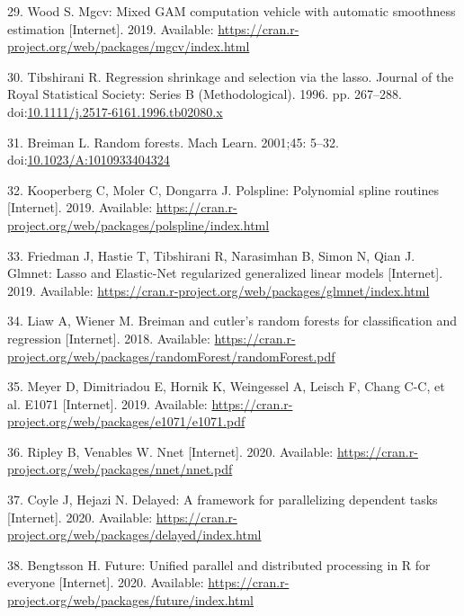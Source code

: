 \documentclass[10pt,letterpaper]{article}
\begin{document}
\leavevmode\hypertarget{ref-Wood2019-rc}{}%
29. Wood S. Mgcv: Mixed GAM computation vehicle with automatic
smoothness estimation {[}Internet{]}. 2019. Available:
\url{https://cran.r-project.org/web/packages/mgcv/index.html}

\leavevmode\hypertarget{ref-Tibshirani1996-vt}{}%
30. Tibshirani R. Regression shrinkage and selection via the lasso.
Journal of the Royal Statistical Society: Series B (Methodological).
1996. pp. 267--288.
doi:\href{https://doi.org/10.1111/j.2517-6161.1996.tb02080.x}{10.1111/j.2517-6161.1996.tb02080.x}

\leavevmode\hypertarget{ref-Breiman2001-vm}{}%
31. Breiman L. Random forests. Mach Learn. 2001;45: 5--32.
doi:\href{https://doi.org/10.1023/A:1010933404324}{10.1023/A:1010933404324}

\leavevmode\hypertarget{ref-Kooperberg2019-ma}{}%
32. Kooperberg C, Moler C, Dongarra J. Polspline: Polynomial spline
routines {[}Internet{]}. 2019. Available:
\url{https://cran.r-project.org/web/packages/polspline/index.html}

\leavevmode\hypertarget{ref-Friedman2019-uw}{}%
33. Friedman J, Hastie T, Tibshirani R, Narasimhan B, Simon N, Qian J.
Glmnet: Lasso and Elastic-Net regularized generalized linear models
{[}Internet{]}. 2019. Available:
\url{https://cran.r-project.org/web/packages/glmnet/index.html}

\leavevmode\hypertarget{ref-Liaw2018-fe}{}%
34. Liaw A, Wiener M. Breiman and cutler's random forests for
classification and regression {[}Internet{]}. 2018. Available:
\url{https://cran.r-project.org/web/packages/randomForest/randomForest.pdf}

\leavevmode\hypertarget{ref-Meyer2019-gr}{}%
35. Meyer D, Dimitriadou E, Hornik K, Weingessel A, Leisch F, Chang C-C,
et al. E1071 {[}Internet{]}. 2019. Available:
\url{https://cran.r-project.org/web/packages/e1071/e1071.pdf}

\leavevmode\hypertarget{ref-Ripley2020-ds}{}%
36. Ripley B, Venables W. Nnet {[}Internet{]}. 2020. Available:
\url{https://cran.r-project.org/web/packages/nnet/nnet.pdf}

\leavevmode\hypertarget{ref-Coyle2020-rq}{}%
37. Coyle J, Hejazi N. Delayed: A framework for parallelizing dependent
tasks {[}Internet{]}. 2020. Available:
\url{https://cran.r-project.org/web/packages/delayed/index.html}

\leavevmode\hypertarget{ref-Bengtsson2020-oz}{}%
38. Bengtsson H. Future: Unified parallel and distributed processing in
R for everyone {[}Internet{]}. 2020. Available:
\url{https://cran.r-project.org/web/packages/future/index.html}
\end{document}
